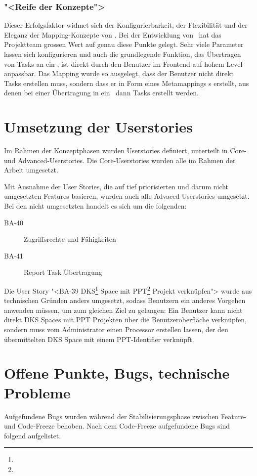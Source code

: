 			
		\subsubsection{"<Reife der Konzepte">}
			Dieser Erfolgsfaktor widmet sich der Konfigurierbarkeit, der Flexibilität und der Eleganz der Mapping-Konzepte von \eeppi.
			Bei der Entwicklung von \eeppi\ hat das Projektteam grossen Wert auf genau diese Punkte gelegt.
			Sehr viele Parameter lassen sich konfigurieren und auch die grundlegende Funktion,
			das Übertragen von Tasks an ein \ppt, ist direkt durch den Benutzer im Frontend auf hohem Level anpassbar.
			Das Mapping wurde so ausgelegt, dass der Benutzer nicht direkt Tasks erstellen muss,
			sondern dass er in Form eines Metamappings \ttpl s erstellt,
			aus denen bei einer Übertragung in ein \ppt\ dann Tasks erstellt werden.
			
			
	\section{Umsetzung der Userstories}
		Im Rahmen der Konzeptphasen wurden Userstories definiert, unterteilt in Core- und Advanced-Userstories.
		Die Core-Userstories wurden alle im Rahmen der Arbeit umgesetzt.
		
		Mit Ausnahme der User Stories, die auf tief priorisierten und darum nicht umgesetzten Features basieren, wurden auch alle Advaced-Userstories umgesetzt.
		Bei den nicht umgesetzten handelt es sich um die folgenden:
		
		\begin{description}
			\item[BA-40] Zugriffsrechte und Fähigkeiten
			\item[BA-41] Report Task Übertragung
		\end{description}
		
		Die User Story "<BA-39 DKS\footnote{\dks} Space mit PPT\footnote{\ppt} Projekt verknüpfen"> wurde aus technischen Gründen anders umgesetzt, 
		sodass Benutzern ein anderes Vorgehen anwenden müssen, um zum gleichen Ziel zu gelangen: Ein Benutzer kann nicht direkt DKS Spaces mit PPT Projekten über die Benutzeroberfläche verknüpfen, sondern muss vom Administrator einen Processor erstellen lassen, der den übermittelten DKS Space mit einem PPT-Identifier verknüpft.

	
	\section{Offene Punkte, Bugs, technische Probleme}
		Aufgefundene Bugs wurden während der Stabilisierungsphase zwischen Feature- und Code-Freeze behoben. Nach dem Code-Freeze aufgefundene Bugs sind folgend aufgelistet.
	
